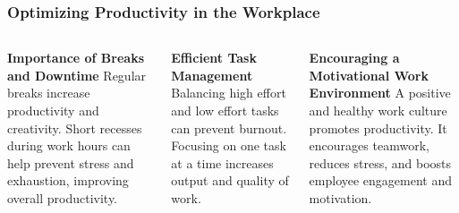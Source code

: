 \documentclass[5pt]{beamer}
\begin{document}
\begin{frame}
\frametitle{Optimizing Productivity in the Workplace}
\begin{columns}
\begin{column}{0.3\textwidth}
\begin{block}{\textbf{Importance of Breaks and Downtime}}
Regular breaks increase productivity and creativity. Short recesses during work hours can help prevent stress and exhaustion, improving overall productivity.
\end{block}
\end{column}
\begin{column}{0.3\textwidth}
\begin{block}{\textbf{Efficient Task Management}}
Balancing high effort and low effort tasks can prevent burnout. Focusing on one task at a time increases output and quality of work.
\end{block}
\end{column}
\begin{column}{0.3\textwidth}
\begin{block}{\textbf{Encouraging a Motivational Work Environment}}
A positive and healthy work culture promotes productivity. It encourages teamwork, reduces stress, and boosts employee engagement and motivation.
\end{block}
\end{column}
\end{columns}
\end{frame}
\end{document}
